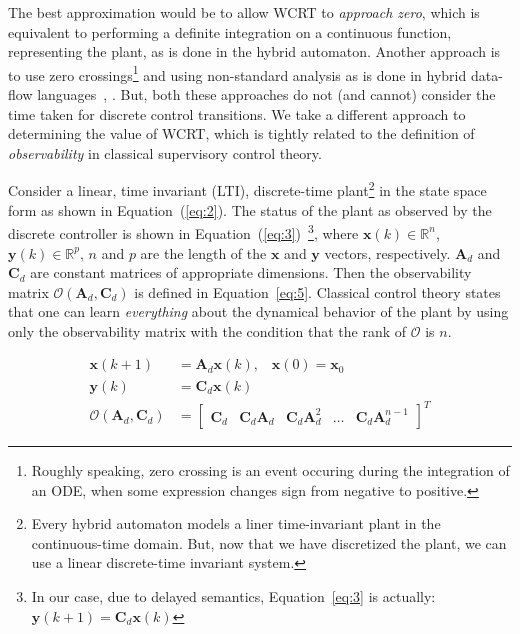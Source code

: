 \documentclass[10pt,journal,cspaper,compsoc]{IEEEtran}
\begin{document}
The best approximation would be to allow WCRT to \textit{approach zero},
which is equivalent to performing a definite integration on a continuous
function, representing the plant, as is done in the hybrid
automaton. Another approach is to use zero crossings\footnote{Roughly
  speaking, zero crossing is an event occuring during the integration of
  an ODE, when some expression changes sign from negative to positive.}
and using non-standard analysis as is done in hybrid data-flow
languages~\cite{DBLP:conf/hybrid/BourkeP13}, \cite{simulink}. But, both
these approaches do not (and cannot) consider the time taken for
discrete control transitions. We take a different approach to
determining the value of WCRT, which is tightly related to the
definition of \textit{observability} in classical supervisory control
theory.

Consider a linear, time invariant (LTI), discrete-time
plant\footnote{Every hybrid automaton models a liner time-invariant
  plant in the continuous-time domain. But, now that we have discretized
  the plant, we can use a linear discrete-time invariant system.} in the
state space form as shown in Equation~(\ref{eq:2}). The status of the
plant as observed by the discrete controller is shown in
Equation~(\ref{eq:3})~\footnote{In our case, due to delayed semantics,
  Equation~\ref{eq:3} is actually: \mbox{$\mathbf{y}(k+1) = \mathbf{C}_d
    \mathbf{x}(k)$}}, where $\mathbf{x}(k) \in \mathbb{R}^n$,
$\mathbf{y}(k) \in \mathbb{R}^p$, $n$ and $p$ are the length of the
$\mathbf{x}$ and $\mathbf{y}$ vectors, respectively. $\mathbf{A}_d$ and
$\mathbf{C}_d$ are constant matrices of appropriate dimensions. Then the
observability matrix $\mathcal{O}(\mathbf{A}_d, \mathbf{C}_d)$ is
defined in Equation~\ref{eq:5}. Classical control theory states that one
can learn \textit{everything} about the dynamical behavior of the plant
by using only the observability matrix with the condition that the rank
of $\mathcal{O}$ is $n$.

\begin{scriptsize}
\begin{align}
   \mathbf{x}(k + 1) & = \mathbf{A}_d\mathbf{x}(k), \hspace{10pt} \mathbf{x}(0) =
   \mathbf{x}_0 
   \label{eq:2} \\
   \mathbf{y}(k) & = \mathbf{C}_d\mathbf{x}(k)
   \label{eq:3} \\
\mathcal{O}(\mathbf{A}_d, \mathbf{C}_d) & =
   \left[
   \begin{array}{ccccc}
     \mathbf{C}_d &
     \mathbf{C}_d\mathbf{A}_d& 
     \mathbf{C}_d\mathbf{A}_d^2 &
     \ldots&
     \mathbf{C}_d\mathbf{A}_d^{n-1}
   \end{array}
   \right]^T
   \label{eq:5}
\end{align}
\end{scriptsize}
\end{document}
